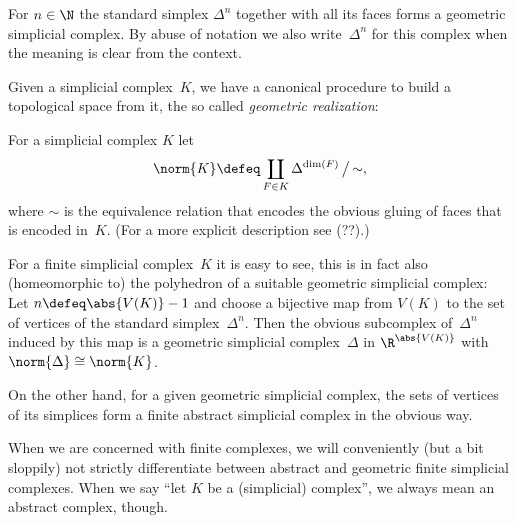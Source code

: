 \begin{thExample}
    For $n\in\N$ the standard simplex $\Delta^n$ together with all its faces
    forms a geometric simplicial complex. By abuse of notation we also
    write~$\Delta^n$ for this complex when the meaning is clear from the
    context.
\end{thExample}

Given a simplicial complex~$K$, we have a canonical procedure to build a
topological space from it, the so called \emph{geometric realization}:

\begin{thDef}
    For a simplicial complex $K$ let
    \[ \norm{K} \defeq \coprod_{F\in K} \Delta^{\dim(F)} \,\big/\,{\sim}  , \]
    where $\sim$ is the equivalence relation that encodes the obvious gluing
    of faces that is encoded in~$K$.
    (For a more explicit description see (??).) %
\end{thDef}

For a finite simplicial complex~$K$ it is easy to see, this is in fact also
(homeomorphic to) the polyhedron of a suitable geometric simplicial complex:
Let $n \defeq \abs{V(K)} - 1$ and choose a bijective map from $V(K)$ to the
set of vertices of the standard simplex~$\Delta^n$. Then the obvious subcomplex
of~$\Delta^n$ induced by this map is a geometric simplicial complex~$\Delta$
in $\R^{\abs{V(K)}}$ with $\norm{\Delta} \cong \norm{K}$.

On the other hand, for a given geometric simplicial complex, the sets of
vertices of its simplices form a finite abstract simplicial complex in the
obvious way.

\begin{thConvention}
    When we are concerned with finite complexes, we will conveniently (but a bit
    sloppily) not strictly differentiate between abstract and geometric finite
    simplicial complexes.
    When we say \enquote{let $K$ be a (simplicial) complex}, we always mean an
    abstract complex, though.
%
%
\end{thConvention}

